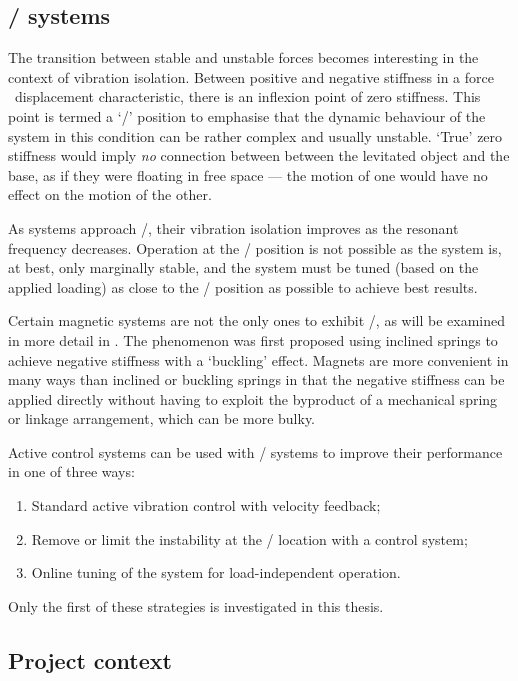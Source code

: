 \documentclass[11pt,a4paper]{memoir}
\begin{document}
\subsection{\QZS/ systems}

The transition between stable and unstable forces becomes interesting in the context of vibration isolation.
Between positive and negative stiffness in a force \vs\ displacement characteristic, there is an inflexion point of zero stiffness.
This point is termed a `\qzs/' position to emphasise that the dynamic behaviour of the system in this condition can be rather complex and usually unstable.
`True' zero stiffness would imply \emph{no} connection between between the levitated object and the base, as if they were floating in free space — the motion of one would have no effect on the motion of the other.

As systems approach \qzs/, their vibration isolation improves as the resonant frequency decreases.
Operation at the \qzs/ position is not possible as the system is, at best, only marginally stable, and the system must be tuned (based on the applied loading) as close to the \qzs/ position as possible to achieve best results.

Certain magnetic systems are not the only ones to exhibit \qzs/, as will be examined in more detail in .
The phenomenon was first proposed using inclined springs to achieve negative stiffness with a `buckling' effect.
Magnets are more convenient in many ways than inclined or buckling springs in that the negative stiffness can be applied directly without having to exploit the byproduct of a mechanical spring or linkage arrangement, which can be more bulky.

Active control systems can be used with \qzs/ systems to improve their performance in one of three ways:
\begin{enumerate}
  \item Standard active vibration control with velocity feedback;
  \item Remove or limit the instability at the \qzs/ location with a control system;
  \item Online tuning of the system for load-independent operation.
\end{enumerate}
Only the first of these strategies is investigated in this thesis.


\subsection{Project context}
\end{document}
